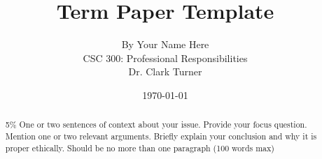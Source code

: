 \documentclass[11pt]{article}
\begin{document}
\title{\vfill Term Paper Template} %
\author{
By Your Name Here\vspace{10pt} \\
CSC 300: Professional Responsibilities\vspace{10pt} \\
Dr. Clark Turner\vspace{10pt} \\
}
\date{\today}

\maketitle

\vfill  %
\begin{abstract}
5\%  One or two sentences of context about your issue. Provide your focus question. Mention one or two relevant arguments.  Briefly explain your conclusion and why it is proper ethically. Should be no more than one paragraph (100 words max) \cite{handout}
\end{abstract}

\thispagestyle{empty} %
\newpage


\thispagestyle{empty}  %
\tableofcontents

\newpage

\end{document}
